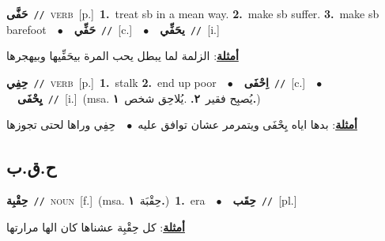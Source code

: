 \documentclass[10pt,a4paper,twoside]{article} %
\begin{document}
\begin{multicols}{2}
{\setlength\topsep{0pt}\textbf{\foreignlanguage{arabic}{حَفَّى}}\ {\color{gray}\texttt{//}\color{black}}\ \textsc{verb}\ [p.]\ \textbf{1.}~treat sb in a mean way.  \textbf{2.}~make sb suffer.  \textbf{3.}~make sb barefoot\ \ $\bullet$\ \ \setlength\topsep{0pt}\textbf{\foreignlanguage{arabic}{حَفِّي}}\ {\color{gray}\texttt{//}\color{black}}\ [c.]\ \ $\bullet$\ \ \setlength\topsep{0pt}\textbf{\foreignlanguage{arabic}{يحَفِّي}}\ {\color{gray}\texttt{//}\color{black}}\ [i.]\  \begin{flushright}\color{gray}\foreignlanguage{arabic}{\textbf{\underline{\foreignlanguage{arabic}{أمثلة}}}: الزلمة لما يبطل يحب المرة بيحَفِّيها وبيهجرها}\end{flushright}\color{black}} \vspace{2mm}

{\setlength\topsep{0pt}\textbf{\foreignlanguage{arabic}{حِفِي}}\ {\color{gray}\texttt{//}\color{black}}\ \textsc{verb}\ [p.]\ \textbf{1.}~stalk  \textbf{2.}~end up poor\ \ $\bullet$\ \ \setlength\topsep{0pt}\textbf{\foreignlanguage{arabic}{اِحْفَى}}\ {\color{gray}\texttt{//}\color{black}}\ [c.]\ \ $\bullet$\ \ \setlength\topsep{0pt}\textbf{\foreignlanguage{arabic}{يِحْفَى}}\ {\color{gray}\texttt{//}\color{black}}\ [i.]\ \color{gray}(msa. \foreignlanguage{arabic}{يُصبِح فقير}~\foreignlanguage{arabic}{\textbf{٢.}}  .\foreignlanguage{arabic}{يُلاحِق شخص}~\foreignlanguage{arabic}{\textbf{١.}})\color{black}\  \begin{flushright}\color{gray}\foreignlanguage{arabic}{\textbf{\underline{\foreignlanguage{arabic}{أمثلة}}}: بدها اياه يِحْفَى ويتمرمر عشان توافق عليه\ $\bullet$\ \  حِفِي وراها لحتى تجوزها}\end{flushright}\color{black}} \vspace{2mm}

\vspace{-3mm}
\subsection*{\color{blue}\foreignlanguage{arabic}{ح.ق.ب}\color{blue}{}} 

{\setlength\topsep{0pt}\textbf{\foreignlanguage{arabic}{حِقْبِة}}\ {\color{gray}\texttt{//}\color{black}}\ \textsc{noun}\ [f.]\ \color{gray}(msa. \foreignlanguage{arabic}{حِقْبَة}~\foreignlanguage{arabic}{\textbf{١.}})\color{black}\ \textbf{1.}~era\ \ $\bullet$\ \ \setlength\topsep{0pt}\textbf{\foreignlanguage{arabic}{حِقَب}}\ {\color{gray}\texttt{//}\color{black}}\ [pl.]\  \begin{flushright}\color{gray}\foreignlanguage{arabic}{\textbf{\underline{\foreignlanguage{arabic}{أمثلة}}}: كل حِقْبِة عشناها كان الها مرارتها}\end{flushright}\color{black}} \vspace{2mm}


\end{multicols}
\end{document}
